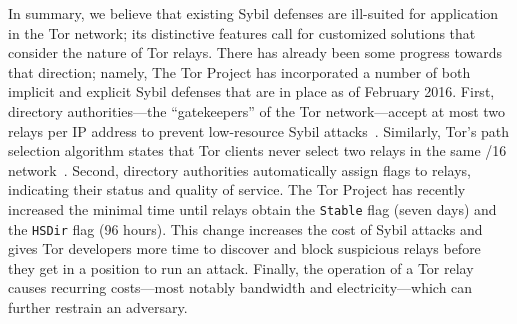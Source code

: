 In summary, we believe that existing Sybil defenses are ill-suited for
application in the Tor network; its distinctive features call for customized
solutions that consider the nature of Tor relays.  There has already been some
progress towards that direction; namely, The Tor Project has incorporated a
number of both implicit and explicit Sybil defenses that are in place as of
February 2016.  First, directory authorities---the ``gatekeepers'' of the Tor
network---accept at most two relays per IP address to prevent low-resource
Sybil attacks~\cite{Bauer2007a,Bauer2007b}.  Similarly, Tor's path selection
algorithm states that Tor clients never select two relays in the same /16
network~\cite{path-spec}.  Second, directory authorities automatically assign
flags to relays, indicating their status and quality of service.  The Tor
Project has recently increased the minimal time until relays obtain the
\texttt{Stable} flag (seven days) and the \texttt{HSDir} flag (96 hours).  This
change increases the cost of Sybil attacks and gives Tor developers more time
to discover and block suspicious relays before they get in a position to run an
attack.  Finally, the operation of a Tor relay causes recurring costs---most
notably bandwidth and electricity---which can further restrain an adversary.
